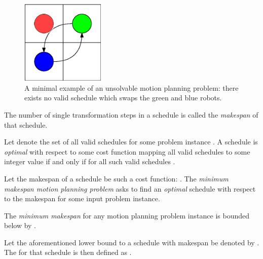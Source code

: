 \begin{figure}[h]
	\centering
	\includegraphics[width=4cm]{include/impossible_2x2.eps}
	\caption{A minimal example of an unsolvable motion planning problem: there exists no valid schedule which swaps the green and blue robots.}\label{fig:reachability}
\end{figure}

\begin{definition}\label{def:makespan}
	The number of single transformation steps in a schedule is called the \emph{makespan} of that schedule.
\end{definition}

\begin{definition}\label{def:optimality}
	Let \ilmath{\schedules} denote the set of all valid schedules for some problem instance . A schedule  is \emph{optimal} with respect to some cost function  mapping all valid schedules to some integer value if and only if  for all such valid schedules  \fda{\(\in \schedules\)}.
\end{definition}

\begin{definition}\label{def:m3pp}
	Let the makespan of a schedule be such a cost function: . The \emph{minimum makespan motion planning problem} asks to find an \emph{optimal} schedule with respect to the makespan  for some input problem instance.
\end{definition}

\begin{remark}
	The \emph{minimum makespan} for any motion planning problem instance  is bounded below by .
\end{remark}

\begin{definition}
	Let the aforementioned lower bound to a schedule with makespan  be denoted by . The  for that schedule is then defined as  .
\end{definition}

